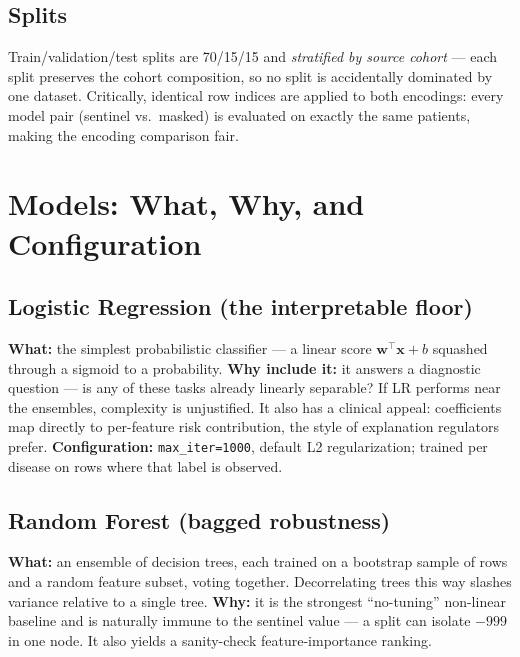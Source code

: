 \documentclass[journal]{IEEEtran}
\begin{document}
\subsection{Splits}
Train/validation/test splits are 70/15/15 and \emph{stratified by source cohort} --- each split preserves the cohort composition, so no split is accidentally dominated by one dataset. Critically, identical row indices are applied to both encodings: every model pair (sentinel vs.\ masked) is evaluated on exactly the same patients, making the encoding comparison fair.

\section{Models: What, Why, and Configuration}
\subsection{Logistic Regression (the interpretable floor)}
\textbf{What:} the simplest probabilistic classifier --- a linear score $\mathbf{w}^\top\mathbf{x}+b$ squashed through a sigmoid to a probability. \textbf{Why include it:} it answers a diagnostic question --- is any of these tasks already linearly separable? If LR performs near the ensembles, complexity is unjustified. It also has a clinical appeal: coefficients map directly to per-feature risk contribution, the style of explanation regulators prefer. \textbf{Configuration:} \texttt{max\_iter=1000}, default L2 regularization; trained per disease on rows where that label is observed.

\subsection{Random Forest (bagged robustness)}
\textbf{What:} an ensemble of decision trees, each trained on a bootstrap sample of rows and a random feature subset, voting together. Decorrelating trees this way slashes variance relative to a single tree. \textbf{Why:} it is the strongest ``no-tuning'' non-linear baseline and is naturally immune to the sentinel value --- a split can isolate $-999$ in one node. It also yields a sanity-check feature-importance ranking.
\end{document}
